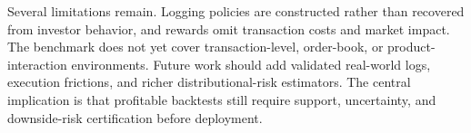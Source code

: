 \documentclass[conference]{IEEEtran}
\begin{document}
Several limitations remain. Logging policies are constructed rather than recovered from investor behavior, and rewards omit transaction costs and market impact. The benchmark does not yet cover transaction-level, order-book, or product-interaction environments. Future work should add validated real-world logs, execution frictions, and richer distributional-risk estimators. The central implication is that profitable backtests still require support, uncertainty, and downside-risk certification before deployment.

{\scriptsize


}
\end{document}
